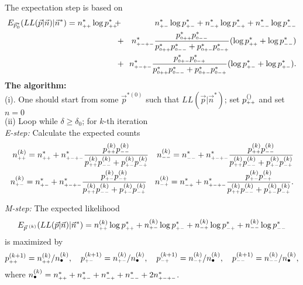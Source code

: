 \documentclass[11pt]{article}
\begin{document}
The expectation step is based on 
\begin{eqnarray*}
E_{\vec{p}^{*}_0} (LL(\vec p|\vec n)|\vec n^*)=n_{\ssc ++}^*\log p_{\ssc ++}^*&\!\!+\!\!&n_{\ssc +-}^*\log p_{\ssc +-}^*+ n_{\ssc -+}^*\log p_{\ssc -+}^*+ n_{\ssc --}^*\log p_{\ssc --}^*\\ 
\!\!&+\!\!& 
n_{\ssc +-+-}^*\frac{p_{\ssc 0++}^*p_{\ssc 0--}^*}{p_{\ssc 0++}^*p_{\ssc 0--}^*+p_{\ssc 0+-}^*p_{\ssc 0-+}^*} (\log p_{\ssc ++}^*+\log p_{\ssc --}^*)\\
\!\!&+\!\!&n_{\ssc +-+-}^*\frac{p_{\ssc 0+-}^*p_{\ssc 0-+}^*}{p_{\ssc 0++}^*p_{\ssc 0--}^*+p_{\ssc 0+-}^*p_{\ssc 0-+}^*} (\log p_{\ssc +-}^*+\log p_{\ssc +-}^*). 
\end{eqnarray*}
%
{\bf The algorithm:} \\ 
(i). One should start from some $\vec p^{*(0)}$ such that $LL(\vec p|\vec n^*)$; set $p_{\scriptscriptstyle ++}^{()}$ 
and set $n=0$\\

\noindent
(ii) Loop while $\delta\geq\delta_0$; for $k$-th iteration\\
{\it E-step:} Calculate the expected counts
\begin{eqnarray*}
n_{\scriptscriptstyle ++}^{(k)}=n_{\scriptscriptstyle ++}^*+n_{\scriptscriptstyle +-+-}^*\frac{p_{\scriptscriptstyle ++}^{(k)}p_{\scriptscriptstyle --}^{(k)}}{p_{\scriptscriptstyle ++}^{(k)}p_{\scriptscriptstyle --}^{(k)}+p_{\scriptscriptstyle +-}^{(k)}p_{\scriptscriptstyle -+}^{(k)}}\quad
n_{\scriptscriptstyle --}^{(k)}=n_{\scriptscriptstyle --}^*+n_{\scriptscriptstyle +-+-}^*\frac{p_{\scriptscriptstyle ++}^{(k)}p_{\scriptscriptstyle --}^{(k)}}{p_{\scriptscriptstyle ++}^{(k)}p_{\scriptscriptstyle --}^{(k)}+p_{\scriptscriptstyle +-}^{(k)}p_{\scriptscriptstyle -+}^{(k)}}\\
n_{\scriptscriptstyle +-}^{(k)}=n_{\scriptscriptstyle +-}^*+n_{\scriptscriptstyle +-+-}^*\frac{p_{\scriptscriptstyle +-}^{(k)}p_{\scriptscriptstyle -+}^{(k)}}{p_{\scriptscriptstyle ++}^{(k)}p_{\scriptscriptstyle --}^{(k)}+p_{\scriptscriptstyle +-}^{(k)}p_{\scriptscriptstyle -+}^{(k)}}\quad
n_{\scriptscriptstyle -+}^{(k)}=n_{\scriptscriptstyle -+}^*+n_{\scriptscriptstyle +-+-}^*\frac{p_{\scriptscriptstyle +-}^{(k)}p_{\scriptscriptstyle -+}^{(k)}}{p_{\scriptscriptstyle ++}^{(k)}p_{\scriptscriptstyle --}^{(k)}+p_{\scriptscriptstyle +-}^{(k)}p_{\scriptscriptstyle -+}^{(k)}}.
\end{eqnarray*} 

\noindent
{\it M-step:}  The expected likelihood
$$
E_{\vec{p}^{\;(k)}} (LL(\vec p|\vec n)|\vec n^*)=n_{\scriptscriptstyle ++}^{(k)}\log p_{\scriptscriptstyle ++}^*+n_{\scriptscriptstyle +-}^{(k)}\log p_{\scriptscriptstyle +-}^*+n_{\scriptscriptstyle -+}^{(k)}\log p_{\scriptscriptstyle -+}^*+n_{\scriptscriptstyle --}^{(k)}\log p_{\scriptscriptstyle --}^*
$$
is maximized by
$$
p_{\scriptscriptstyle ++}^{(k+1)}=n_{\scriptscriptstyle ++}^{(k)}/n_{\bullet}^{(k)},\quad
p_{\scriptscriptstyle +-}^{(k+1)}=n_{\scriptscriptstyle +-}^{(k)}/n_{\bullet}^{(k)},\quad
p_{\scriptscriptstyle -+}^{(k+1)}=n_{\scriptscriptstyle -+}^{(k)}/n_{\bullet}^{(k)},\quad
p_{\scriptscriptstyle --}^{(k+1)}=n_{\scriptscriptstyle --}^{(k)}/n_{\bullet}^{(k)},
$$
where $n_{\bullet}^{(k)}=n_{\scriptscriptstyle ++}^*+n_{\scriptscriptstyle +-}^*+n_{\scriptscriptstyle -+}^*+n_{\scriptscriptstyle --}^*+2 n_{\scriptscriptstyle +-+-}^*$. 
\end{document}
